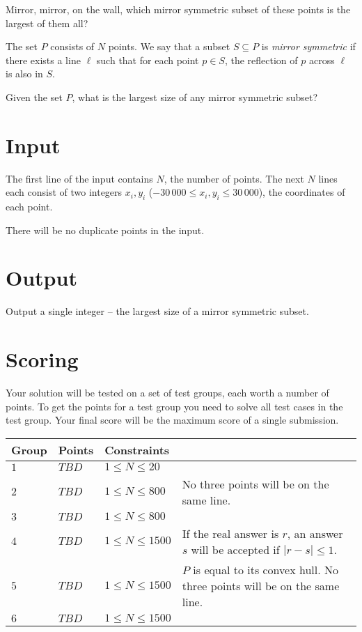 
Mirror, mirror, on the wall, which mirror symmetric subset of these points is the largest of them all?

The set $P$ consists of $N$ points.
We say that a subset $S \subseteq P$ is \emph{mirror symmetric} if there exists a line $\ell$ such that for each point $p \in S$, the reflection of $p$ across $\ell$ is also in $S$.

Given the set $P$, what is the largest size of any mirror symmetric subset?

\section*{Input}
The first line of the input contains $N$, the number of points.
The next $N$ lines each consist of two integers $x_i, y_i$ ($-30\,000 \le x_i, y_i \le 30\,000$), the coordinates of each point.

There will be no duplicate points in the input.

\section*{Output}
Output a single integer -- the largest size of a mirror symmetric subset.

\section*{Scoring}
Your solution will be tested on a set of test groups, each worth a number of points.
To get the points for a test group you need to solve all test cases in the test group.
Your final score will be the maximum score of a single submission.

\noindent
\begin{tabular}{| l | l | l | l |}
\hline
Group & Points & Constraints \\ \hline
$1$    & $TBD$         & $1 \leq N \leq 20$ & \\ \hline
$2$    & $TBD$         & $1 \leq N \leq 800$ & No three points will be on the same line.\\ \hline
$3$    & $TBD$         & $1 \leq N \leq 800$ & \\ \hline
$4$    & $TBD$         & $1 \leq N \leq 1500$ & If the real answer is $r$, an answer $s$ will be accepted if $|r-s| \leq 1$.\\ \hline
$5$    & $TBD$         & $1 \leq N \leq 1500$ & $P$ is equal to its convex hull. No three points will be on the same line.\\ \hline
$6$    & $TBD$         & $1 \leq N \leq 1500$ & \\ \hline
\end{tabular}
